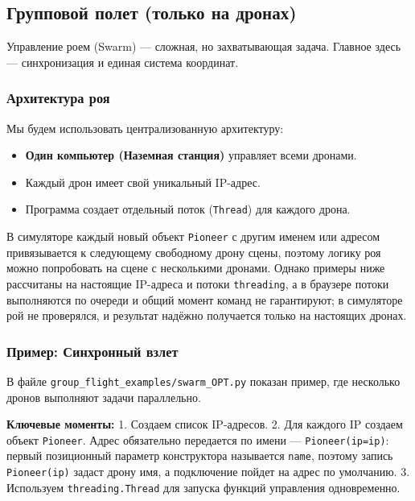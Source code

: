 \subsection{Групповой полет (только на дронах)}
\label{sec:python-swarm}

Управление роем (Swarm) — сложная, но захватывающая задача. Главное здесь — синхронизация и единая система координат.

\subsubsection*{Архитектура роя}
Мы будем использовать централизованную архитектуру:
\begin{itemize}
    \item \textbf{Один компьютер (Наземная станция)} управляет всеми дронами.
    \item Каждый дрон имеет свой уникальный IP-адрес.
    \item Программа создает отдельный поток (\texttt{Thread}) для каждого дрона.
\end{itemize}

\begin{infobox}
В симуляторе каждый новый объект \verb|Pioneer| с другим именем или адресом привязывается к следующему свободному дрону сцены, поэтому логику роя можно попробовать на сцене с несколькими дронами. Однако примеры ниже рассчитаны на настоящие IP-адреса и потоки \verb|threading|, а в браузере потоки выполняются по очереди и общий момент команд не гарантируют; в симуляторе рой не проверялся, и результат надёжно получается только на настоящих дронах.
\end{infobox}

\subsubsection*{Пример: Синхронный взлет}
В файле \texttt{group\_flight\_examples/swarm\_OPT.py} показан пример, где несколько дронов выполняют задачи параллельно.

\textbf{Ключевые моменты:}
1. Создаем список IP-адресов.
2. Для каждого IP создаем объект \texttt{Pioneer}. Адрес обязательно передается по имени --- \texttt{Pioneer(ip=ip)}: первый позиционный параметр конструктора называется \texttt{name}, поэтому запись \texttt{Pioneer(ip)} задаст дрону имя, а подключение пойдет на адрес по умолчанию.
3. Используем \texttt{threading.Thread} для запуска функций управления одновременно.

